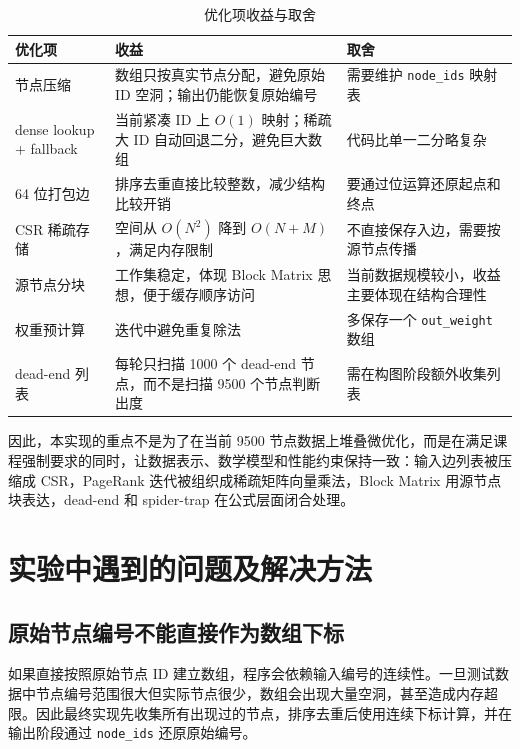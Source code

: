 \documentclass[UTF8,a4paper,10pt]{ctexart}
\newcommand{\xiaosi}{\fontsize{12pt}{20pt}\selectfont}
\begin{document}
\begin{table}[H]
  \centering
  \caption{优化项收益与取舍}
  \small
  \begin{tabularx}{\textwidth}{p{3.2cm} Y Y}
    \toprule
    \textbf{优化项} & \textbf{收益} & \textbf{取舍} \\
    \midrule
    节点压缩 & 数组只按真实节点分配，避免原始 ID 空洞；输出仍能恢复原始编号 & 需要维护 \texttt{node\_ids} 映射表 \\
    dense lookup + fallback & 当前紧凑 ID 上 $O(1)$ 映射；稀疏大 ID 自动回退二分，避免巨大数组 & 代码比单一二分略复杂 \\
    64 位打包边 & 排序去重直接比较整数，减少结构比较开销 & 要通过位运算还原起点和终点 \\
    CSR 稀疏存储 & 空间从 $O(N^2)$ 降到 $O(N+M)$，满足内存限制 & 不直接保存入边，需要按源节点传播 \\
    源节点分块 & 工作集稳定，体现 Block Matrix 思想，便于缓存顺序访问 & 当前数据规模较小，收益主要体现在结构合理性 \\
    权重预计算 & 迭代中避免重复除法 & 多保存一个 \texttt{out\_weight} 数组 \\
    dead-end 列表 & 每轮只扫描 1000 个 dead-end 节点，而不是扫描 9500 个节点判断出度 & 需在构图阶段额外收集列表 \\
    \bottomrule
  \end{tabularx}
\end{table}

因此，本实现的重点不是为了在当前 9500 节点数据上堆叠微优化，而是在满足课程强制要求的同时，让数据表示、数学模型和性能约束保持一致：输入边列表被压缩成 CSR，PageRank 迭代被组织成稀疏矩阵向量乘法，Block Matrix 用源节点块表达，dead-end 和 spider-trap 在公式层面闭合处理。

\section{实验中遇到的问题及解决方法}
\xiaosi

\subsection{原始节点编号不能直接作为数组下标}

如果直接按照原始节点 ID 建立数组，程序会依赖输入编号的连续性。一旦测试数据中节点编号范围很大但实际节点很少，数组会出现大量空洞，甚至造成内存超限。因此最终实现先收集所有出现过的节点，排序去重后使用连续下标计算，并在输出阶段通过 \texttt{node\_ids} 还原原始编号。
\end{document}
